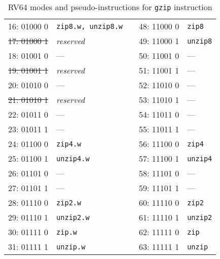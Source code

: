 \begin{table}[h]
\begin{small}
\begin{center}
\begin{tabular}{c l p{1in} c l}
\cline{1-2}
\cline{4-5}

      16: 01000 0  & {\tt zip8.w, unzip8.w}   &   &         48: 11000 0  & {\tt zip8}              \\
\sout{17: 01000 1} & {\it reserved}           &   &         49: 11000 1  & {\tt unzip8}            \\
      18: 01001 0  & ---                      &   &         50: 11001 0  & ---                     \\
\sout{19: 01001 1} & {\it reserved}           &   &         51: 11001 1  & ---                     \\
      20: 01010 0  & ---                      &   &         52: 11010 0  & ---                     \\
\sout{21: 01010 1} & {\it reserved}           &   &         53: 11010 1  & ---                     \\
      22: 01011 0  & ---                      &   &         54: 11011 0  & ---                     \\
      23: 01011 1  & ---                      &   &         55: 11011 1  & ---                     \\

\cline{1-2}
\cline{4-5}

      24: 01100 0  & {\tt zip4.w}             &   &         56: 11100 0  & {\tt zip4}              \\
      25: 01100 1  & {\tt unzip4.w}           &   &         57: 11100 1  & {\tt unzip4}            \\
      26: 01101 0  & ---                      &   &         58: 11101 0  & ---                     \\
      27: 01101 1  & ---                      &   &         59: 11101 1  & ---                     \\
      28: 01110 0  & {\tt zip2.w}             &   &         60: 11110 0  & {\tt zip2}              \\
      29: 01110 1  & {\tt unzip2.w}           &   &         61: 11110 1  & {\tt unzip2}            \\
      30: 01111 0  & {\tt zip.w}              &   &         62: 11111 0  & {\tt zip}               \\
      31: 01111 1  & {\tt unzip.w}            &   &         63: 11111 1  & {\tt unzip}             \\
\end{tabular}
\end{center}
\end{small}
\caption{RV64 modes and pseudo-instructions for {\tt gzip} instruction}
\label{gzip64-modes}
\end{table}

